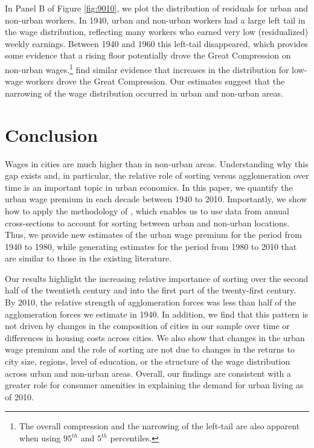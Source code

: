\documentclass[12pt]{article}
\begin{document}
In Panel B of Figure \ref{fig:9010}, we plot the distribution of residuals for urban and non-urban workers.
In 1940, urban and non-urban workers had a large left tail in the wage distribution, reflecting many workers who earned very low (residualized) weekly earnings.
Between 1940 and 1960 this left-tail disappeared, which provides some evidence that a rising floor potentially drove the Great Compression on non-urban wages.\footnote{
The overall compression and the narrowing of the left-tail are also apparent when using $95^{th}$ and $5^{th}$ percentiles.} \citet{goldin1992great} find similar evidence that increases in the distribution for low-wage workers drove the Great Compression.
Our estimates suggest that the narrowing of the wage distribution occurred in urban and non-urban areas.

\section{Conclusion}


Wages in cities are much higher than in non-urban areas.
Understanding why this gap exists and, in particular, the relative role of sorting versus agglomeration over time is an important topic in urban economics.
In this paper, we quantify the urban wage premium in each decade between 1940 to 2010.
Importantly, we show how to apply the methodology of \citet{altonji2018estimating}, which enables us to use data from annual cross-sections to account for sorting between urban and non-urban locations.
Thus, we provide new estimates of the urban wage premium for the period from 1940 to 1980, while generating estimates for the period from 1980 to 2010 that are similar to those in the existing literature. 

Our results highlight the increasing relative importance of sorting over the second half of the twentieth century and into the first part of the twenty-first century.
By 2010, the relative strength of agglomeration forces was less than half of the agglomeration forces we estimate in 1940.
In addition, we find that this pattern is not driven by changes in the composition of cities in our sample over time or differences in housing costs across cities.
We also show that changes in the urban wage premium and the role of sorting are not due to changes in the returns to city size, regions, level of education, or the structure of the wage distribution across urban and non-urban areas.
Overall, our findings are consistent with a greater role for consumer amenities in explaining the demand for urban living as of 2010.
\end{document}
